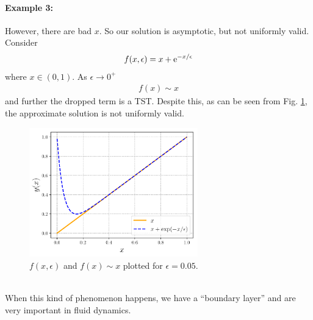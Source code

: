 \paragraph{Example 3:} However, there are bad $x$. So our solution is asymptotic, but not uniformly valid. Consider
\begin{gather*}
	f(x,\epsilon) = x + \mathrm{e}^{-x/\epsilon}
\end{gather*}
where $x \in (0,1)$. As $\epsilon \rightarrow 0^+$
\begin{gather*}
	f(x)\sim x
\end{gather*}
and further the dropped term is a TST. Despite this, as can be seen from Fig. \ref{fig:strogatz-wk11-ex3}, the approximate solution is not uniformly valid. 
\begin{figure}[!h]
	\centering
	\includegraphics[width=0.65\textwidth]{./plots/pdf/strogatz-wk11-ex3.pdf}
	\caption{$f(x,\epsilon)$ and $f(x)\sim x$ plotted for $\epsilon = 0.05$.}
	\label{fig:strogatz-wk11-ex3}
\end{figure} \\
When this kind of phenomenon happens, we have a ``boundary layer'' and are very important in fluid dynamics.

